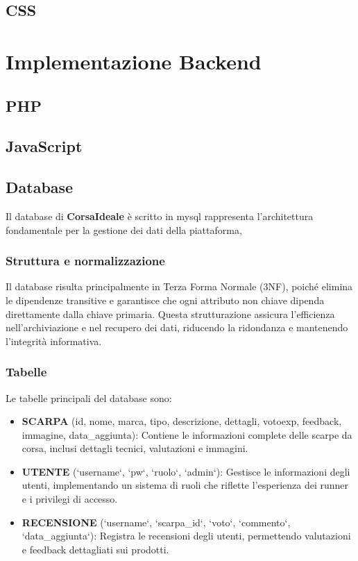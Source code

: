 \documentclass[a4paper, 12pt]{article}
\begin{document}
\begin{justify}
\subsection{CSS}


\section{Implementazione Backend}

\subsection{PHP}

\subsection{JavaScript}

\subsection{Database}
Il database di \textbf{CorsaIdeale} è scritto in mysql rappresenta l'architettura fondamentale per la gestione dei dati della piattaforma,
\subsubsection{Struttura e normalizzazione}
Il database risulta principalmente in Terza Forma Normale (3NF), poiché elimina le dipendenze transitive e garantisce che ogni attributo non chiave dipenda direttamente dalla chiave primaria. Questa strutturazione assicura l'efficienza nell'archiviazione e nel recupero dei dati, riducendo la ridondanza e mantenendo l'integrità informativa.
\subsubsection{Tabelle}
Le tabelle principali del database sono:
\begin{itemize}
\item \textbf{SCARPA} (id, nome, marca, tipo, descrizione, dettagli, votoexp, feedback, immagine, data\_aggiunta): Contiene le informazioni complete delle scarpe da corsa, inclusi dettagli tecnici, valutazioni e immagini.
\item \textbf{UTENTE} (`username`, `pw`, `ruolo`, `admin`): Gestisce le informazioni degli utenti, implementando un sistema di ruoli che riflette l'esperienza dei runner e i privilegi di accesso.

\item \textbf{RECENSIONE} (`username`, `scarpa\_id`, `voto`, `commento`, `data\_aggiunta`): Registra le recensioni degli utenti, permettendo valutazioni e feedback dettagliati sui prodotti.


\end{itemize}
\end{justify}
\end{document}

